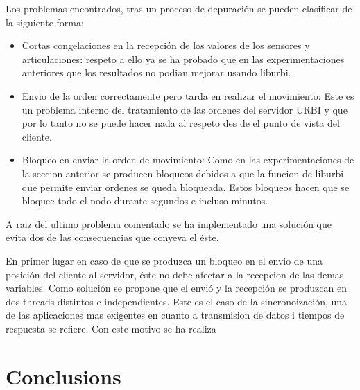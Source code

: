 \documentclass[12pt,a4paper,final,twoside]{article}
\begin{document}
Los problemas encontrados, tras un proceso de depuración se pueden clasificar de la siguiente forma:
\begin{itemize}
\item Cortas congelaciones en la recepción de los valores de los sensores y articulaciones: respeto a ello ya se ha probado que en las experimentaciones anteriores que los resultados no podian mejorar usando liburbi.
\item Envio de la orden correctamente pero tarda en realizar el movimiento: Este es un problema interno del tratamiento de las ordenes del servidor URBI y que por lo tanto no se puede hacer nada al respeto des de el punto de vista del cliente.
\item Bloqueo en enviar la orden de movimiento: Como en las experimentaciones de la seccion anterior se producen bloqueos debidos a que la funcion de liburbi que permite enviar ordenes se queda bloqueada. Estos bloqueos hacen que se bloquee todo el nodo durante segundos e incluso minutos.
\end{itemize}

A raiz del ultimo problema comentado se ha implementado una solución que evita dos de las consecuencias que conyeva el éste.

En primer lugar en caso de que se produzca un bloqueo en el envio de una posición del cliente al servidor, éste no debe afectar a la recepcion de las demas variables. Como solución se propone que el envió y la recepción se produzcan en dos threads distintos e independientes. 
 Este es el caso de la sincronoización, una de las aplicaciones mas exigentes en cuanto a transmision de datos i tiempos de respuesta se refiere.
Con este motivo se ha realiza 

\section*{Conclusions}
\end{document}
